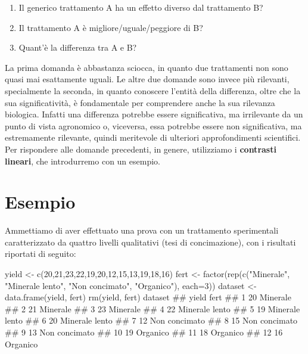 \documentclass[a4paper,12pt,oneside]{book}
\providecommand{\tightlist}{%
  \setlength{\itemsep}{0pt}\setlength{\parskip}{0pt}}
\newenvironment{Shaded}{}{}
\newcommand{\KeywordTok}[1]{#1}
\newcommand{\DataTypeTok}[1]{#1}
\newcommand{\DecValTok}[1]{#1}
\newcommand{\StringTok}[1]{#1}
\newcommand{\CommentTok}[1]{#1}
\newcommand{\NormalTok}[1]{#1}
\begin{document}
\begin{enumerate}
\def\labelenumi{\arabic{enumi}.}
\tightlist
\item
  Il generico trattamento A ha un effetto diverso dal trattamento B?
\item
  Il trattamento A è migliore/uguale/peggiore di B?
\item
  Quant'è la differenza tra A e B?
\end{enumerate}

La prima domanda è abbastanza sciocca, in quanto due trattamenti non sono quasi mai esattamente uguali. Le altre due domande sono invece più rilevanti, specialmente la seconda, in quanto conoscere l'entità della differenza, oltre che la sua significatività, è fondamentale per comprendere anche la sua rilevanza biologica. Infatti una differenza potrebbe essere significativa, ma irrilevante da un punto di vista agronomico o, viceversa, essa potrebbe essere non significativa, ma estremamente rilevante, quindi meritevole di ulteriori approfondimenti scientifici. Per rispondere alle domande precedenti, in genere, utilizziamo i \textbf{contrasti lineari}, che introdurremo con un esempio.

\hypertarget{esempio-1}{%
\section{Esempio}\label{esempio-1}}

Ammettiamo di aver effettuato una prova con un trattamento sperimentali caratterizzato da quattro livelli qualitativi (tesi di concimazione), con i risultati riportati di seguito:

\begin{Shaded}
\begin{Highlighting}[]
\NormalTok{yield <-}\StringTok{ }\KeywordTok{c}\NormalTok{(}\DecValTok{20}\NormalTok{,}\DecValTok{21}\NormalTok{,}\DecValTok{23}\NormalTok{,}\DecValTok{22}\NormalTok{,}\DecValTok{19}\NormalTok{,}\DecValTok{20}\NormalTok{,}\DecValTok{12}\NormalTok{,}\DecValTok{15}\NormalTok{,}\DecValTok{13}\NormalTok{,}\DecValTok{19}\NormalTok{,}\DecValTok{18}\NormalTok{,}\DecValTok{16}\NormalTok{)}
\NormalTok{fert <-}\StringTok{ }\KeywordTok{factor}\NormalTok{(}\KeywordTok{rep}\NormalTok{(}\KeywordTok{c}\NormalTok{(}\StringTok{"Minerale"}\NormalTok{, }\StringTok{"Minerale lento"}\NormalTok{, }
          \StringTok{"Non concimato"}\NormalTok{, }\StringTok{"Organico"}\NormalTok{), }\DataTypeTok{each=}\DecValTok{3}\NormalTok{))}
\NormalTok{dataset <-}\StringTok{ }\KeywordTok{data.frame}\NormalTok{(yield, fert)}
\KeywordTok{rm}\NormalTok{(yield, fert)}
\NormalTok{dataset}
\CommentTok{##    yield           fert}
\CommentTok{## 1     20       Minerale}
\CommentTok{## 2     21       Minerale}
\CommentTok{## 3     23       Minerale}
\CommentTok{## 4     22 Minerale lento}
\CommentTok{## 5     19 Minerale lento}
\CommentTok{## 6     20 Minerale lento}
\CommentTok{## 7     12  Non concimato}
\CommentTok{## 8     15  Non concimato}
\CommentTok{## 9     13  Non concimato}
\CommentTok{## 10    19       Organico}
\CommentTok{## 11    18       Organico}
\CommentTok{## 12    16       Organico}
\end{Highlighting}
\end{Shaded}
\end{document}
